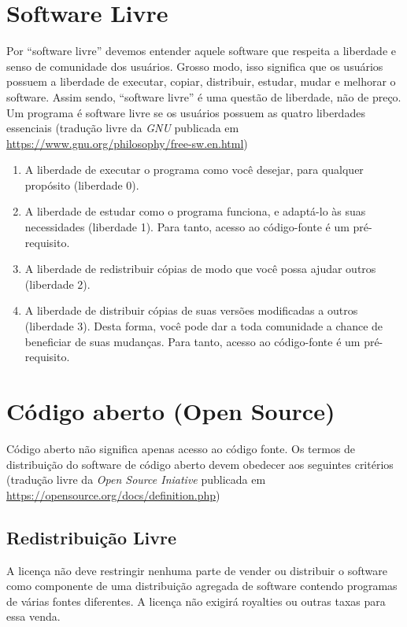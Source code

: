 \section{Software Livre}
Por “software livre” devemos entender aquele software que respeita a liberdade e senso de comunidade dos usuários. Grosso modo, isso significa que os usuários possuem a liberdade de executar, copiar, distribuir, estudar, mudar e melhorar o software. Assim sendo, “software livre” é uma questão de liberdade, não de preço. 
Um programa é software livre se os usuários possuem as quatro liberdades essenciais (tradução livre da \textit{GNU} publicada em \url{https://www.gnu.org/philosophy/free-sw.en.html}) \cite{GNUFS}
 \begin{enumerate}
   \item A liberdade de executar o programa como você desejar, para qualquer propósito (liberdade 0).
   \item A liberdade de estudar como o programa funciona, e adaptá-lo às suas necessidades (liberdade 1). Para tanto, acesso ao código-fonte é um pré-requisito.
   \item A liberdade de redistribuir cópias de modo que você possa ajudar outros (liberdade 2).
   \item A liberdade de distribuir cópias de suas versões modificadas a outros (liberdade 3). Desta forma, você pode dar a toda comunidade a chance de beneficiar de suas mudanças. Para tanto, acesso ao código-fonte é um pré-requisito.
 \end{enumerate}


\section{Código aberto (Open Source)}
Código aberto não significa apenas acesso ao código fonte. Os termos de distribuição do software de código aberto devem obedecer aos seguintes critérios (tradução livre da \textit{Open Source Iniative} publicada em \url{https://opensource.org/docs/definition.php}) \cite{OSIdefinition}

\subsection{Redistribuição Livre}
A licença não deve restringir nenhuma parte de vender ou distribuir o software como componente de uma distribuição agregada de software contendo programas de várias fontes diferentes. A licença não exigirá royalties ou outras taxas para essa venda.


